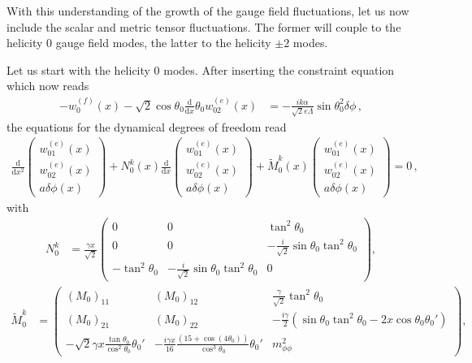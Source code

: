 With this understanding of the growth of the gauge field fluctuations, let us now include the scalar and metric tensor fluctuations. The former will couple to the helicity 0 gauge field modes, the latter to the helicity $\pm2$ modes. 

Let us start with the helicity 0 modes. After inserting the constraint equation which now reads
\begin{align}
 -    w^{(f)}_{0}(x)- \sqrt{2}  \cos \theta_0  \tfrac{\textrm{d}}{\textrm{d}x}\theta_{0} w^{(e)}_{02}(x) & = -  \frac{i k \alpha}{\sqrt{2} e \Lambda} \sin \theta^2_0 \delta \phi \,, \label{eq:0constraintphi}
\end{align}
the equations for the dynamical degrees of freedom read
\begin{align}
  \frac{\textrm{d} }{\textrm{d}x^2}\left(\begin{array}{c}
  w^{(e)}_{01}(x)\\
 w^{(e)}_{02}(x) \\
 a \delta \phi(x) 
\end{array}\right)
+ N^k_0(x)  \frac{\textrm{d} }{\textrm{d}x}\left(\begin{array}{c}
  w^{(e)}_{01}(x)\\
 w^{(e)}_{02}(x) \\
 a \delta \phi(x) 
\end{array}\right) + 
 \tilde M^k_{0}(x)\left(\begin{array}{c}
w^{(e)}_{01}(x)\\
w^{(e)}_{02}(x) \\
 a \delta \phi(x)
\end{array}\right)  = 0\,, \label{eq:fullscalar}
\end{align}
with 
\begin{align}
 N^k_0 & = \frac{\gamma x}{\sqrt{2}} \begin{pmatrix}
     0 & 0 &  \tan^2 \theta_0 \\
     0 & 0 & - \frac{i}{\sqrt{2}} \sin \theta_0 \tan^2 \theta_0 \\
     - \tan^2 \theta_0 & - \frac{i}{\sqrt{2}} \sin \theta_0 \tan^2 \theta_0  & 0
                                            \end{pmatrix},
\end{align}
\begin{align}
 \tilde M^k_0 & = \begin{pmatrix}
        \left(M_0\right)_{11} &  \left(M_0\right)_{12}  & \frac{\gamma}{\sqrt{2}} \tan^2 \theta_0 \\
      \left(M_0\right)_{21}  &
        \left(M_0\right)_{22} 	& -\frac{i \gamma}{2} \left(\sin \theta_0 \tan^2 \theta_0 - 2 x \cos \theta_0 \theta_0'\right) \\
        - \sqrt{2} \gamma x  \frac{\tan \theta_0}{\cos^2 \theta_0} \theta_0' & -\frac{i \gamma x}{16} \frac{\left(15 + \cos\left(4 \theta_0\right) \right)}{\cos^3 \theta_0} \theta_0' & m_{\phi \phi}^2
                     \end{pmatrix},  \label{eq:M0full}         
\end{align}
